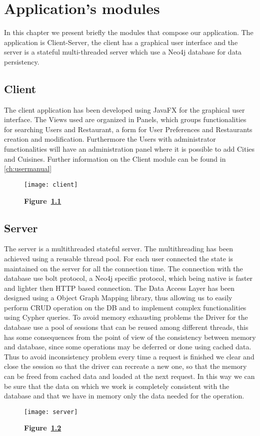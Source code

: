 \chapter{Application's modules}\label{ch:modules}
In this chapter we present briefly the modules that compose our application. 
The application is Client-Server, the client has a graphical user interface and
the server is a stateful multi-threaded server which use a Neo4j database for
data persistency.

	\section{Client}\label{sec:client}
	The client application has been developed using JavaFX for the graphical
	user interface. The Views used are organized in Panels, which groups
	functionalities for searching Users and Restaurant, a form for User 
	Preferences and Restaurants creation and modification. Furthermore the
	Users with administrator functionalities will have an administration
	panel where it is possible to add Cities and Cuisines. Further
	information on the Client module can be found in \ref{ch:usermanual}
	\begin{figure}[!h]
		\texttt{[image: client]}
		\caption*{\textbf{Figure~\ref{fig:client}}}
		\captionlistentry{}
		\label{fig:client}
	\end{figure}

	\section{Server}\label{sec:server}
	The server is a multithreaded stateful server. The multithreading has
	been achieved using a reusable thread pool. 
	For each user connected the state is maintained on the server
	for all the connection time.
	The connection with the database use bolt protocol, a Neo4j specific
	protocol, which being native is faster and lighter then HTTP based 
	connection. The Data Access Layer has been designed using a Object Graph
	Mapping library, thus allowing us to easily perform CRUD operation on
	the DB and to implement complex functionalities using Cypher queries. 
	To avoid memory exhausting problems the Driver for the database use a
	pool of sessions that can be reused among different threads, this has
	some consequences from the point of view of the consistency between
	memory and database, since some operations may be deferred or done using
	cached data. Thus to avoid inconsistency problem every time a request is
	finished we clear and close the session so that the driver can recreate
	a new one, so that the memory can be freed from cached data and loaded 
	at the next request. In this way  we can be sure that the data on which 
	we work is completely consistent with the database and that we have in
	memory only the data needed for the operation.
	\begin{figure}[!h]
		\texttt{[image: server]}
		\caption*{\textbf{Figure~\ref{fig:server}}}
		\captionlistentry{}
		\label{fig:server}
	\end{figure}

